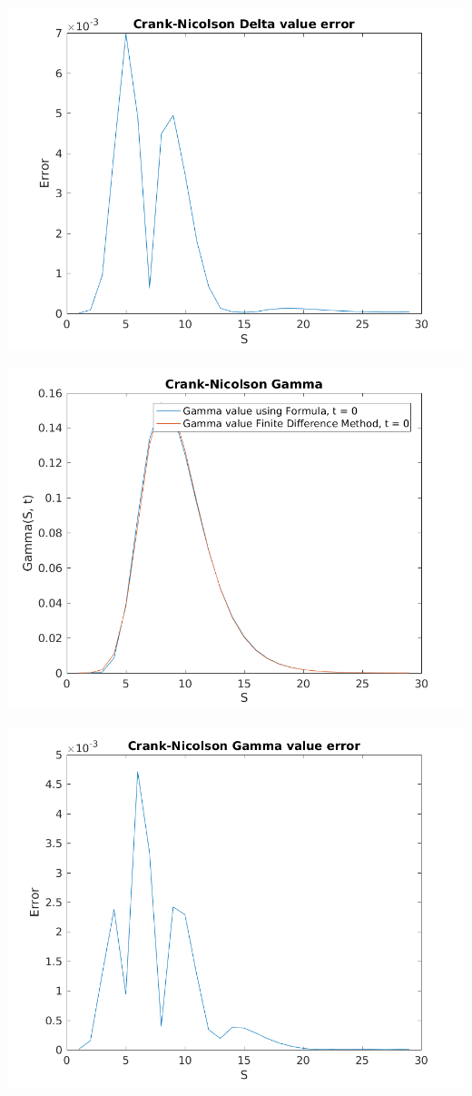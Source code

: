 \documentclass{article}
\begin{document}
\includegraphics{"q1_27"}
\pagebreak


\includegraphics{"q1_28"}
\pagebreak


\includegraphics{"q1_29"}
\pagebreak
\end{document}
